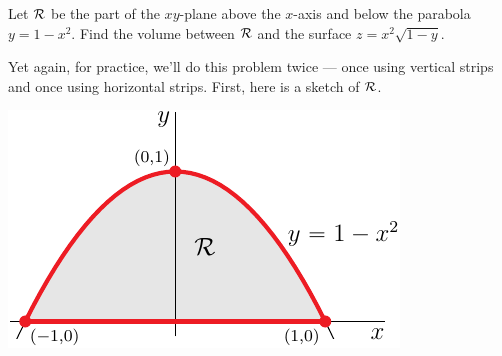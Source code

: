\begin{eg}[Volume]\label{eg dblInt V0}
Let $\mathcal{R}$ be the part of the $xy$-plane above the $x$-axis and below 
the parabola $y=1-x^2$. Find the volume between $\mathcal{R}$ and the surface
$z=x^2\sqrt{1-y}$.

\soln
Yet again, for practice, we'll do this problem twice --- once using 
vertical strips and once using horizontal strips. First, here is a 
sketch of $\mathcal{R}$.
\begin{efig}
\begin{center}
   \includegraphics{dblIntV0a.pdf}
\end{center}
\end{efig}



\end{eg}
